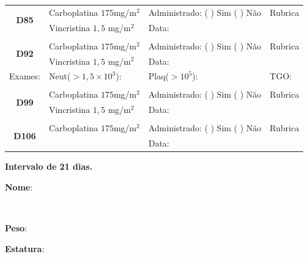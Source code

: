 \documentclass[11pt,a4paper,oldfontcommands]{memoir}
\def\entrywithlabel[#1]#2{\parbox{#1}{{\small #2:} \hrulefill}}
\begin{document}
\begin{center}
\begin{table}[H]
\begin{tabular}{p{1.3cm}p{4.9cm}|p{4.7cm}|p{3cm}}
    \hline
    \multicolumn{1}{c|}{\multirow{2}{*}{\textbf{D85}}}&{Carboplatina \(175\)mg/m\(^2\)}&{Administrado: (  ) Sim (  ) Não}&{Rubrica}\\
    \multicolumn{1}{c|}{}&{Vincristina \(1,5\) mg/m\(^2\)}&{Data:}&\\
    \hline
    \\
    \hline
    \multicolumn{1}{c|}{\multirow{2}{*}{\textbf{D92}}}&{Carboplatina \(175\)mg/m\(^2\)}&{Administrado: (  ) Sim (  ) Não}&{Rubrica}\\
    \multicolumn{1}{c|}{}&{Vincristina \(1,5\) mg/m\(^2\)}&{Data:}&\\
    \hline
    \multicolumn{1}{c|}{Exames:}&{Neut(\(>1,5\times10^3\)):}&{Plaq(\(>10^5\)):}&{TGO:}
    \\
    \hline
    \\
    \hline
    \multicolumn{1}{c|}{\multirow{2}{*}{\textbf{D99}}}&{Carboplatina \(175\)mg/m\(^2\)}&{Administrado: (  ) Sim (  ) Não}&{Rubrica}\\
    \multicolumn{1}{c|}{}&{Vincristina \(1,5\) mg/m\(^2\)}&{Data:}&\\
    \hline
    \\
    \hline
    \multicolumn{1}{c|}{\multirow{2}{*}{\textbf{D106}}}&{Carboplatina \(175\)mg/m\(^2\)}&{Administrado: (  ) Sim (  ) Não}&{Rubrica}\\
	\multicolumn{1}{c|}{}&&{Data:}&\\
    \hline
\end{tabular}
\end{table}
\textbf{Intervalo de 21 dias.}
\pagebreak

\noindent
\entrywithlabel[1\hsize]{\textbf{Nome}}\hfill
\\[0.3cm]
\entrywithlabel[.45\hsize]{\textbf{Peso}}\hfill  \entrywithlabel[.45\hsize]{\textbf{Estatura}}


\end{center}
\end{document}
